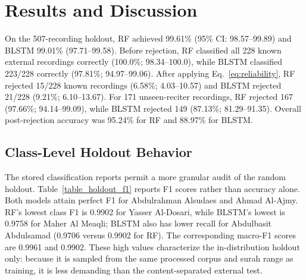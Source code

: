 \documentclass[a4paper,conference]{IEEEtran}
\begin{document}
\section{Results and Discussion}

On the 507-recording holdout, RF achieved 99.61\% (95\% CI: 98.57--99.89) and BLSTM 99.01\% (97.71--99.58). Before rejection, RF classified all 228 known external recordings correctly (100.0\%; 98.34--100.0), while BLSTM classified 223/228 correctly (97.81\%; 94.97--99.06). After applying Eq.~\ref{eq:reliability}, RF rejected 15/228 known recordings (6.58\%; 4.03--10.57) and BLSTM rejected 21/228 (9.21\%; 6.10--13.67). For 171 unseen-reciter recordings, RF rejected 167 (97.66\%; 94.14--99.09), while BLSTM rejected 149 (87.13\%; 81.29--91.35). Overall post-rejection accuracy was 95.24\% for RF and 88.97\% for BLSTM.

\begin{table}[htbp]
\centering
\caption{Summary of evaluation results across all experimental settings.}
\label{table3}
\renewcommand{\arraystretch}{1.1}
\setlength{\tabcolsep}{3pt}
\end{table}

\subsection{Class-Level Holdout Behavior}

The stored classification reports permit a more granular audit of the random holdout. Table~\ref{table_holdout_f1} reports F1 scores rather than accuracy alone. Both models attain perfect F1 for Abdulrahman Alsudaes and Ahmad Al-Ajmy. RF's lowest class F1 is 0.9902 for Yasser Al-Dosari, while BLSTM's lowest is 0.9758 for Maher Al Meaqli; BLSTM also has lower recall for Abdulbasit Abdulsamad (0.9706 versus 0.9902 for RF). The corresponding macro-F1 scores are 0.9961 and 0.9902. These high values characterize the in-distribution holdout only: because it is sampled from the same processed corpus and surah range as training, it is less demanding than the content-separated external test.
\end{document}
